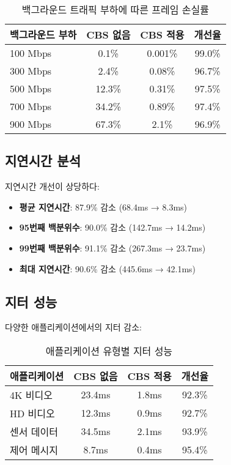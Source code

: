 \documentclass[12pt, a4paper]{article}
\begin{document}
\begin{table}[H]
\centering
\caption{백그라운드 트래픽 부하에 따른 프레임 손실률}
\begin{tabular}{|l|c|c|c|}
\hline
\textbf{백그라운드 부하} & \textbf{CBS 없음} & \textbf{CBS 적용} & \textbf{개선율} \\
\hline
100 Mbps & 0.1\% & 0.001\% & 99.0\% \\
300 Mbps & 2.4\% & 0.08\% & 96.7\% \\
500 Mbps & 12.3\% & 0.31\% & 97.5\% \\
700 Mbps & 34.2\% & 0.89\% & 97.4\% \\
900 Mbps & 67.3\% & 2.1\% & 96.9\% \\
\hline
\end{tabular}
\end{table}

\subsection{지연시간 분석}

지연시간 개선이 상당하다:

\begin{itemize}
    \item \textbf{평균 지연시간}: 87.9\% 감소 (68.4ms → 8.3ms)
    \item \textbf{95번째 백분위수}: 90.0\% 감소 (142.7ms → 14.2ms)
    \item \textbf{99번째 백분위수}: 91.1\% 감소 (267.3ms → 23.7ms)
    \item \textbf{최대 지연시간}: 90.6\% 감소 (445.6ms → 42.1ms)
\end{itemize}

\subsection{지터 성능}

다양한 애플리케이션에서의 지터 감소:

\begin{table}[H]
\centering
\caption{애플리케이션 유형별 지터 성능}
\begin{tabular}{|l|c|c|c|}
\hline
\textbf{애플리케이션} & \textbf{CBS 없음} & \textbf{CBS 적용} & \textbf{개선율} \\
\hline
4K 비디오 & 23.4ms & 1.8ms & 92.3\% \\
HD 비디오 & 12.3ms & 0.9ms & 92.7\% \\
센서 데이터 & 34.5ms & 2.1ms & 93.9\% \\
제어 메시지 & 8.7ms & 0.4ms & 95.4\% \\
\hline
\end{tabular}
\end{table}
\end{document}
